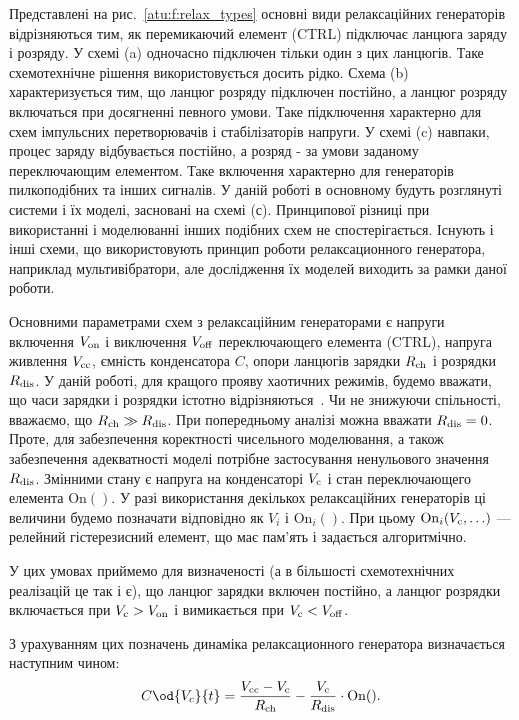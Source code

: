 Представлені на рис.~\ref{atu:f:relax_types} основні види релаксаційних
генераторів відрізняються тим, як перемикаючий елемент
(CTRL) підключає ланцюга заряду і розряду. У схемі (a)
одночасно підключен тільки один з цих ланцюгів. Таке
схемотехнічне рішення використовується досить рідко. Схема (b)
характеризується тим, що ланцюг розряду підключен постійно,
а ланцюг розряду включаться при досягненні певного умови. Таке
підключення характерно для схем імпульсних перетворювачів і
стабілізаторів напруги. У схемі (c) навпаки, процес заряду
відбувається постійно, а розряд - за умови заданому
переключающим елементом. Таке включення характерно для
генераторів пилкоподібних та інших сигналів. У даній роботі в
основному будуть розглянуті системи і їх моделі, засновані на
схемі (с). Принципової різниці при використанні і моделюванні
інших подібних схем не спостерігається. Існують і інші схеми,
що використовують принцип роботи релаксационного генератора,
наприклад мультивібратори, але дослідження їх моделей виходить
за рамки даної роботи.



Основними параметрами схем з релаксаційним генераторами є
напруги включення
$ V _\mathrm{on} $ і виключення
$ V _\mathrm{off} $ переключающего елемента (CTRL), напруга живлення
$ V _\mathrm{cc} $, ємність конденсатора
$ C $, опори ланцюгів зарядки
$ R _\mathrm{ch} $ і розрядки
$ R _\mathrm{dis} $. У даній роботі, для кращого прояву хаотичних
режимів, будемо вважати, що часи зарядки і розрядки істотно
відрізняються~\cite{atu_asau19}. Чи не знижуючи спільності, вважаємо, що
$ R _\mathrm{ch} \gg R _\mathrm{dis} $. При попередньому аналізі можна вважати
$ R _\mathrm{dis} = 0 $. Проте, для забезпечення коректності чисельного
моделювання, а також забезпечення адекватності моделі потрібне
застосування ненульового значення
$ R _\mathrm{dis} $. Змінними стану є напруга на конденсаторі
$ V _\mathrm{c} $ і стан переключающего елемента
$ \mathrm{On}()$. У разі використання декількох релаксаційних
генераторів ці величини будемо позначати відповідно як
$ V_{i} $ і
$ \mathrm{On}_{i}() $. При цьому
$ \mathrm{On}_{i}(V _\mathrm{c}, \ldots) $ --- релейний гістерезисний елемент, що
має пам'ять і задається алгоритмічно.

У цих умовах приймемо для визначеності (а в більшості
схемотехнічних реалізацій це так і є), що ланцюг зарядки включен
постійно, а ланцюг розрядки включається при
$ V _\mathrm{c}> V _\mathrm{on} $ і вимикається при
$ V _\mathrm{c} <V _\mathrm{off} $.

З урахуванням цих позначень динаміка релаксационного
генератора визначається наступним чином:
%
\begin{equation}
  C \od{V_c}{t}
  =
  \frac{V\Tidx{cc} - V\Tidx{c}}{R\Tidx{ch}}
  - \frac{V\Tidx{c}}{R\Tidx{dis}} \cdot \mathrm{On}().
  \label{atu:eq:relax0}
\end{equation}

